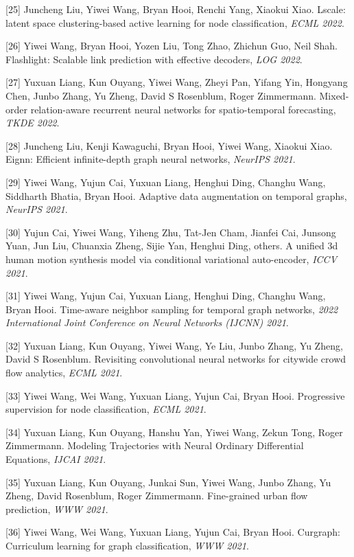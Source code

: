 [25] Juncheng Liu, Yiwei Wang, Bryan Hooi, Renchi Yang, Xiaokui Xiao. Lscale: latent space clustering-based active learning for node classification, \textit{ECML 2022}.

[26] Yiwei Wang, Bryan Hooi, Yozen Liu, Tong Zhao, Zhichun Guo, Neil Shah. Flashlight: Scalable link prediction with effective decoders, \textit{LOG 2022}.

[27] Yuxuan Liang, Kun Ouyang, Yiwei Wang, Zheyi Pan, Yifang Yin, Hongyang Chen, Junbo Zhang, Yu Zheng, David S Rosenblum, Roger Zimmermann. Mixed-order relation-aware recurrent neural networks for spatio-temporal forecasting, \textit{TKDE 2022}.

[28] Juncheng Liu, Kenji Kawaguchi, Bryan Hooi, Yiwei Wang, Xiaokui Xiao. Eignn: Efficient infinite-depth graph neural networks, \textit{NeurIPS 2021}.

[29] Yiwei Wang, Yujun Cai, Yuxuan Liang, Henghui Ding, Changhu Wang, Siddharth Bhatia, Bryan Hooi. Adaptive data augmentation on temporal graphs, \textit{NeurIPS 2021}.

[30] Yujun Cai, Yiwei Wang, Yiheng Zhu, Tat-Jen Cham, Jianfei Cai, Junsong Yuan, Jun Liu, Chuanxia Zheng, Sijie Yan, Henghui Ding, others. A unified 3d human motion synthesis model via conditional variational auto-encoder, \textit{ICCV 2021}.

[31] Yiwei Wang, Yujun Cai, Yuxuan Liang, Henghui Ding, Changhu Wang, Bryan Hooi. Time-aware neighbor sampling for temporal graph networks, \textit{2022 International Joint Conference on Neural Networks (IJCNN) 2021}.

[32] Yuxuan Liang, Kun Ouyang, Yiwei Wang, Ye Liu, Junbo Zhang, Yu Zheng, David S Rosenblum. Revisiting convolutional neural networks for citywide crowd flow analytics, \textit{ECML 2021}.

[33] Yiwei Wang, Wei Wang, Yuxuan Liang, Yujun Cai, Bryan Hooi. Progressive supervision for node classification, \textit{ECML 2021}.

[34] Yuxuan Liang, Kun Ouyang, Hanshu Yan, Yiwei Wang, Zekun Tong, Roger Zimmermann. Modeling Trajectories with Neural Ordinary Differential Equations, \textit{IJCAI 2021}.

[35] Yuxuan Liang, Kun Ouyang, Junkai Sun, Yiwei Wang, Junbo Zhang, Yu Zheng, David Rosenblum, Roger Zimmermann. Fine-grained urban flow prediction, \textit{WWW 2021}.

[36] Yiwei Wang, Wei Wang, Yuxuan Liang, Yujun Cai, Bryan Hooi. Curgraph: Curriculum learning for graph classification, \textit{WWW 2021}.

